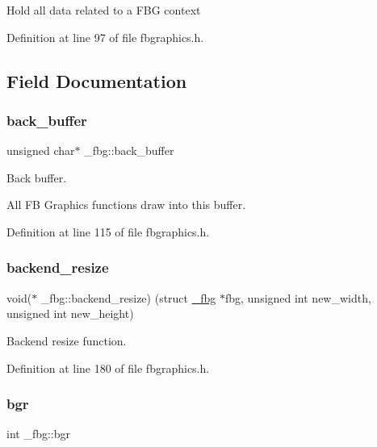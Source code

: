 Hold all data related to a F\+BG context 

Definition at line 97 of file fbgraphics.\+h.



\subsection{Field Documentation}
\mbox{\label{struct__fbg_a907e7fc97965b972c17114c885e53735}} 
\subsubsection{\texorpdfstring{back\+\_\+buffer}{back\_buffer}}
{\footnotesize\ttfamily unsigned char$\ast$ \+\_\+fbg\+::back\+\_\+buffer}



Back buffer. 

All FB Graphics functions draw into this buffer. 

Definition at line 115 of file fbgraphics.\+h.

\mbox{\label{struct__fbg_aef07a92ae059ea2a43653f4d0c5d928e}} 
\subsubsection{\texorpdfstring{backend\+\_\+resize}{backend\_resize}}
{\footnotesize\ttfamily void($\ast$ \+\_\+fbg\+::backend\+\_\+resize) (struct \mbox{\hyperlink{struct__fbg}{\+\_\+fbg}} $\ast$fbg, unsigned int new\+\_\+width, unsigned int new\+\_\+height)}



Backend resize function. 



Definition at line 180 of file fbgraphics.\+h.

\mbox{\label{struct__fbg_a5844c5bf4789117cbc0c972ff160b338}} 
\subsubsection{\texorpdfstring{bgr}{bgr}}
{\footnotesize\ttfamily int \+\_\+fbg\+::bgr}



